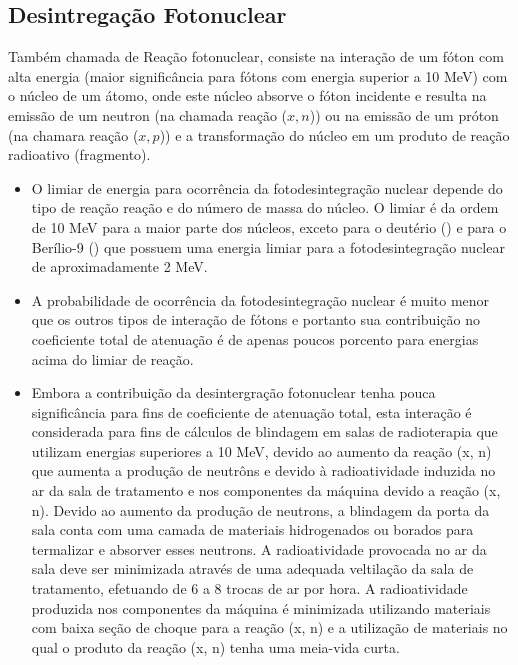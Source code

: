 \documentclass[11pt,a4paper]{article}
\begin{document}
        \subsection{Desintregação Fotonuclear}

            Também chamada de Reação fotonuclear, consiste na interação de um fóton com alta energia (maior significância para fótons com energia superior a 10 MeV) com o núcleo de um átomo, onde este núcleo absorve o fóton incidente e resulta na emissão de um neutron (na chamada reação ($x, n$)) ou na emissão de um próton (na chamara reação ($x, p$)) e a transformação do núcleo em um produto de reação radioativo (fragmento).

                \begin{itemize}
                    \item O limiar de energia para ocorrência da fotodesintegração nuclear depende do tipo de reação reação e do número de massa do núcleo. O limiar é da ordem de 10 MeV para a maior parte dos núcleos, exceto para o deutério () e para o Berílio-9 () que possuem uma energia limiar para a fotodesintegração nuclear de aproximadamente 2 MeV.
                    
                    \item A probabilidade de ocorrência da fotodesintegração nuclear é muito menor que os outros tipos de interação de fótons e portanto sua contribuição no coeficiente total de atenuação é de apenas poucos porcento para energias acima do limiar de reação. 
                    
                    \item Embora a contribuição da desintergração fotonuclear tenha pouca significância para fins de coeficiente de atenuação total, esta interação é considerada para fins de cálculos de blindagem em salas de radioterapia que utilizam energias superiores a 10 MeV, devido ao aumento da reação (x, n) que aumenta a produção de neutrôns e devido à radioatividade induzida no ar da sala de tratamento e nos componentes da máquina devido a reação (x, n). Devido ao aumento da produção de neutrons, a blindagem da porta da sala conta com uma camada de materiais hidrogenados ou borados para termalizar e absorver esses neutrons. A radioatividade provocada no ar da sala deve ser minimizada através de uma adequada veltilação da sala de tratamento, efetuando de 6 a 8 trocas de ar por hora.  A radioatividade produzida nos componentes da máquina é minimizada utilizando materiais com baixa seção de choque para a reação (x, n) e a utilização de materiais no qual o produto da reação (x, n) tenha uma meia-vida curta.
                \end{itemize}
\end{document}
